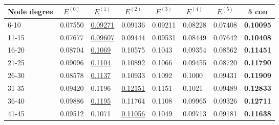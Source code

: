 \begin{table*}[]
    \centering
    \begin{tabular}{|l|l|l|l|l|l|l||l|}
        \hline
        Node degree & \multicolumn{1}{c|}{$E^{(0)}$} & \multicolumn{1}{c|}{$E^{(1)}$} & \multicolumn{1}{c|}{$E^{(2)}$} & \multicolumn{1}{c|}{$E^{(3)}$} & \multicolumn{1}{c|}{$E^{(4)}$} & \multicolumn{1}{c||}{$E^{(5)}$} & \multicolumn{1}{c|}{5 con} \\ \hline
        6-10        & 0.07550                        & \underline{0.09271}            & 0.09136                        & 0.09211                        & 0.08228                        & 0.07408                         & \textbf{0.10095}           \\ \hline
        11-15       & 0.07677                        & \underline{0.09607}            & 0.09444                        & 0.09531                        & 0.08449                        & 0.07642                         & \textbf{0.10408}           \\ \hline
        16-20       & 0.08704                        & \underline{0.1069}             & 0.10575                        & 0.1043                         & 0.09354                        & 0.08562                         & \textbf{0.11451}           \\ \hline
        21-25       & 0.09096                        & \underline{0.1104}             & 0.10892                        & 0.1066                         & 0.09455                        & 0.08720                         & \textbf{0.11790}           \\ \hline
        26-30       & 0.08578                        & \underline{0.1137}             & 0.10933                        & 0.1092                         & 0.1000                         & 0.09431                         & \textbf{0.11909}           \\ \hline
        31-35       & 0.09420                        & 0.1196                         & \underline{0.12151}            & 0.1151                         & 0.1021                         & 0.09489                         & \textbf{0.12833}           \\ \hline
        36-40       & 0.09886                        & \underline{0.1195}             & 0.11764                        & 0.1108                         & 0.09965                        & 0.09326                         & \textbf{0.12711}           \\ \hline
        41-45       & 0.09512                        & 0.1071                         & \underline{0.11056}            & 0.1049                         & 0.09713                        & 0.09181                         & \textbf{0.11638}           \\ \hline

\end{tabular}
\end{table*}
